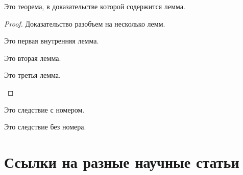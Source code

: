\documentclass[colorthm]{../civarticle}
\begin{document}
\begin{theorem}\label{thm:example:withlemm}
  Это теорема, в доказательстве которой содержится лемма.
  \Blindtext[2]
\end{theorem}
\begin{proof}
  Доказательство разобъем на несколько лемм.

  \begin{lemma}\label{lem:example:in-1}
    Это первая внутренняя лемма.
    \Blindtext[2]
  \end{lemma}

  \Blindtext[2]

  \begin{lemma}\label{lem:example:in-2}
    Это вторая лемма.
    \Blindtext[2]
  \end{lemma}

  \begin{lemma}\label{lem:example:in-3}
    Это третья лемма.
    \Blindtext[2]
  \end{lemma}

  \Blindtext[2]
 \end{proof}

 \Blindtext[11][1]

 \begin{corollary}\label{cor:example:num}
   Это следствие с номером.
   \Blindtext[2]
 \end{corollary}

 \Blindtext[2]

 \begin{corollary*}
   Это следствие без номера.
   \Blindtext[2]
 \end{corollary*}

 \Blindtext[2]


\section{Ссылки на разные научные статьи}
\label{sec:ref-to-articles}

\begin{definition}
  \label{def:001}
  \Blindtext[2]
\end{definition}

\begin{definition*}
  \Blindtext[2]
\end{definition*}

\begin{remark}
  \label{rem:001}
  \Blindtext[2]
\end{remark}

\begin{remark*}
  \Blindtext[2]
\end{remark*}
\end{document}
